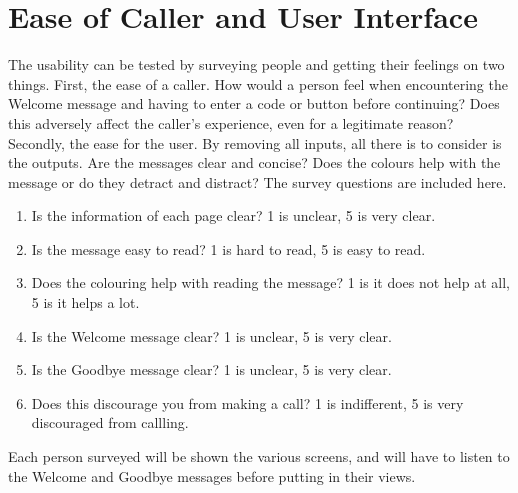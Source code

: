 \documentclass[main.tex]{subfiles}
\begin{document}
\section{Ease of Caller and User Interface}
The usability can be tested by surveying people and getting their feelings on two things. First, the ease of a caller. How would a person feel when encountering the Welcome message and having to enter a code or button before continuing? Does this adversely affect the caller's experience, even for a legitimate reason? Secondly, the ease for the user. By removing all inputs, all there is to consider is the outputs. Are the messages clear and concise? Does the colours help with the message or do they detract and distract? The survey questions are included here.

\begin{enumerate}
	\item Is the information of each page clear? 1 is unclear, 5 is very clear.
	\item Is the message easy to read? 1 is hard to read, 5 is easy to read.
	\item Does the colouring help with reading the message? 1 is it does not help at all, 5 is it helps a lot.
	\item Is the Welcome message clear? 1 is unclear, 5 is very clear.
	\item Is the Goodbye message clear? 1 is unclear, 5 is very clear.
	\item Does this discourage you from making a call? 1 is indifferent, 5 is very discouraged from callling.
\end{enumerate}

Each person surveyed will be shown the various screens, and will have to listen to the Welcome and Goodbye messages before putting in their views.
\end{document}
